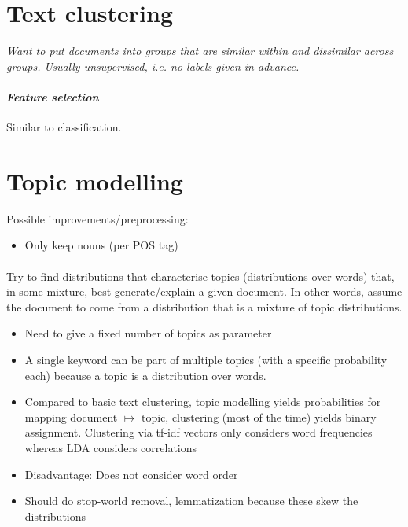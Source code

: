 \documentclass[10pt,twocolumn]{article}
\begin{document}
\section{Text clustering}

\textit{Want to put documents into groups that are similar within and dissimilar
  across groups. Usually unsupervised, i.e. no labels given in advance.}

\paragraph{\textit{Feature selection}} Similar to classification.


\section{Topic modelling}

Possible improvements/preprocessing:
\begin{itemize}
\item Only keep nouns (per POS tag)
\end{itemize}

\paragraph{ } Try to find distributions that
characterise topics (distributions over words) that, in some mixture, best
generate/explain a given document. In other words, assume the document to come
from a distribution that is a mixture of topic distributions. 
\begin{itemize}
\item Need to give a fixed number of topics as parameter
\item A single keyword can be part of multiple topics (with a specific
  probability each) because a topic is a distribution over words.
\item Compared to basic text clustering, topic modelling yields probabilities
  for mapping document $\mapsto$ topic, clustering (most of the time) yields
  binary assignment. Clustering via tf-idf vectors only considers word
  frequencies whereas LDA considers correlations \todo
\item Disadvantage: Does not consider word order
\item Should do stop-world removal, lemmatization because these skew the distributions
\end{itemize}
\end{document}

